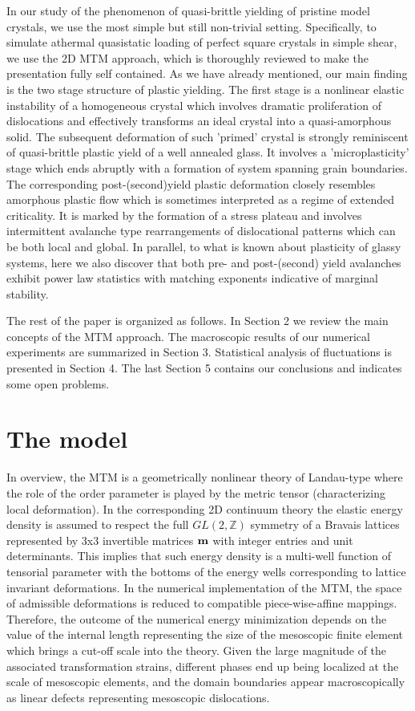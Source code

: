 \documentclass[aps,
superscriptaddress,notitlepage]{revtex4-1}
\begin{document}
In our study of the phenomenon of quasi-brittle yielding of pristine model crystals,  we use  the most simple but still  non-trivial   setting. Specifically, to simulate athermal quasistatic loading of perfect square crystals in simple shear, we use the 2D  MTM approach, which is thoroughly reviewed   to make the presentation fully self contained. As we have already mentioned, our main finding is the two stage structure of plastic yielding.
The   first stage is a nonlinear elastic instability of a homogeneous crystal which involves dramatic  proliferation of dislocations  and effectively transforms an ideal crystal into a quasi-amorphous solid. The subsequent deformation of such 'primed' crystal is strongly reminiscent of quasi-brittle plastic yield of a well annealed glass. It involves a 'microplasticity'  stage which ends abruptly with a formation of  system spanning grain boundaries. The corresponding post-(second)yield plastic deformation closely resembles  amorphous plastic flow which is sometimes interpreted as a regime of extended criticality.  It is marked by the formation of a stress plateau and involves intermittent  avalanche type rearrangements of  dislocational patterns which can be both local and global.  In parallel, to what is known about plasticity of glassy systems, here  we also discover that both pre- and post-(second) yield  avalanches exhibit power law statistics with matching exponents indicative of  marginal stability. 

The rest of the paper is organized as follows. In Section 2 we review  the main concepts of the MTM approach. The macroscopic results of our numerical experiments are summarized in Section 3. Statistical analysis of fluctuations is presented in Section 4. The last Section 5 contains our conclusions and indicates some open problems.


\section{The model}


In overview, the MTM is a  geometrically nonlinear theory of Landau-type where the role of the order parameter  is played by the
metric tensor (characterizing local deformation). In the corresponding 2D continuum theory the elastic energy  density is assumed to respect the full $GL(2, \mathbb{Z})$ symmetry of a Bravais lattices represented by 3x3 invertible matrices $\bf m$ with integer entries and unit determinants. This implies that such energy density is a multi-well function of tensorial parameter with  the bottoms of the energy wells corresponding to lattice invariant deformations. In the numerical implementation of the MTM, the space of admissible deformations is reduced to compatible piece-wise-affine mappings. Therefore, the outcome of the   numerical energy
minimization depends on the value of the internal length   representing the size of the mesoscopic finite element which  brings a cut-off scale into the theory. Given the large magnitude of the associated
transformation strains, different phases end up being localized at the scale of mesoscopic elements, and the domain boundaries appear macroscopically as linear defects  representing mesoscopic dislocations. 
\end{document}
